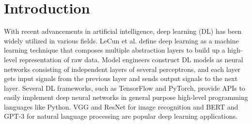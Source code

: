 \section{Introduction}\label{sec:intro}

With recent advancements in artificial intelligence, deep learning (DL) has
been widely utilized in various fields.
LeCun et al.\cite{LeCun2015} define deep learning as a machine learning
technique that composes multiple abstraction layers to build up a high-level
representation of raw data. 
Model engineers construct DL models as neural networks consisting of independent
layers of several perceptrons, and each layer gets input signals from the
previous layer and sends output signals to the next layer.
Several DL frameworks, such as TensorFlow\cite{tensorflow} and
PyTorch\cite{pytorch2019}, provide APIs to easily implement deep neural
networks in general purpose high-level programming languages like Python.
VGG\cite{vggnet2014} and ResNet\cite{resnet2015} for image recognition and
BERT\cite{bert2018} and GPT-3\cite{gpt32020} for natural language processing
are popular deep learning applications.


